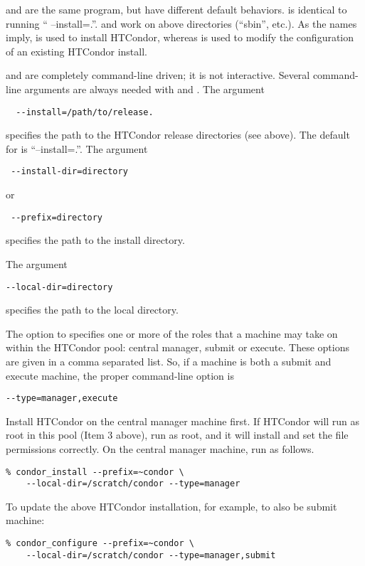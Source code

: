  and  are the same program, but have
different default behaviors.   is identical to
running `` --install=.''.
 and  work on above directories
(``sbin'', etc.).  As the names imply,  is used to
install HTCondor, whereas  is used to modify the
configuration of an existing HTCondor install.

 and  are completely command-line
driven; it is not interactive.  Several command-line arguments are
always needed with  and .
The argument
\begin{verbatim}
  --install=/path/to/release.
\end{verbatim}
specifies the path to the HTCondor release directories (see above).
The default for  is ``--install=.''.
The argument
\begin{verbatim} --install-dir=directory \end{verbatim}
or
\begin{verbatim} --prefix=directory \end{verbatim}
specifies the path to the install directory.

The argument
\begin{verbatim}
--local-dir=directory
\end{verbatim}
specifies the path to the local directory.

The  option to 
specifies one or more of the roles that a machine may take on
within the HTCondor pool: central manager, submit or execute.
These options are given in a comma separated list.
So, if a machine is both a submit and execute
machine, 
the proper command-line option is
\begin{verbatim}
--type=manager,execute
\end{verbatim}

Install HTCondor on the central manager machine first.  If HTCondor
will run as root in this pool (Item 3 above), run  
as root, and it will install and set the file permissions correctly.  
On the central manager machine, run  as follows.
\begin{verbatim}
% condor_install --prefix=~condor \
	--local-dir=/scratch/condor --type=manager
\end{verbatim}

To update the above HTCondor installation, for example, to also be
submit machine:
\begin{verbatim}
% condor_configure --prefix=~condor \
	--local-dir=/scratch/condor --type=manager,submit
\end{verbatim}

